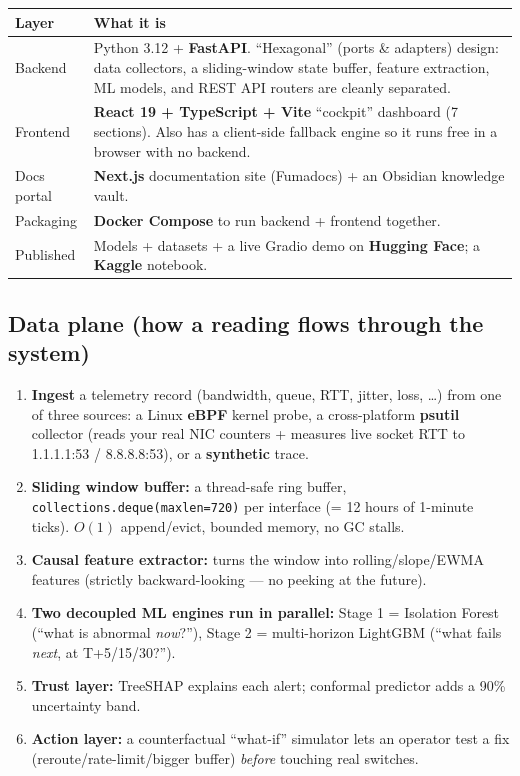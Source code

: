 \documentclass[11pt,a4paper]{article}
\begin{document}
\begin{center}
\begin{tabularx}{\linewidth}{@{}p{3.6cm}X@{}}
\toprule
\textbf{Layer} & \textbf{What it is} \\
\midrule
Backend & Python 3.12 + \textbf{FastAPI}. ``Hexagonal'' (ports \& adapters) design: data collectors, a sliding-window state buffer, feature extraction, ML models, and REST API routers are cleanly separated. \\
Frontend & \textbf{React 19 + TypeScript + Vite} ``cockpit'' dashboard (7 sections). Also has a client-side fallback engine so it runs free in a browser with no backend. \\
Docs portal & \textbf{Next.js} documentation site (Fumadocs) + an Obsidian knowledge vault. \\
Packaging & \textbf{Docker Compose} to run backend + frontend together. \\
Published & Models + datasets + a live Gradio demo on \textbf{Hugging Face}; a \textbf{Kaggle} notebook. \\
\bottomrule
\end{tabularx}
\end{center}

\subsection{Data plane (how a reading flows through the system)}
\begin{enumerate}
  \item \textbf{Ingest} a telemetry record (bandwidth, queue, RTT, jitter, loss, \dots) from one of three
  sources: a Linux \textbf{eBPF} kernel probe, a cross-platform \textbf{psutil} collector (reads your real
  NIC counters + measures live socket RTT to 1.1.1.1:53 / 8.8.8.8:53), or a \textbf{synthetic} trace.
  \item \textbf{Sliding window buffer:} a thread-safe ring buffer, \texttt{collections.deque(maxlen=720)} per
  interface (= 12 hours of 1-minute ticks). $O(1)$ append/evict, bounded memory, no GC stalls.
  \item \textbf{Causal feature extractor:} turns the window into rolling/slope/EWMA features
  (strictly backward-looking --- no peeking at the future).
  \item \textbf{Two decoupled ML engines run in parallel:}
  Stage 1 = Isolation Forest (``what is abnormal \emph{now}?''),
  Stage 2 = multi-horizon LightGBM (``what fails \emph{next}, at T+5/15/30?'').
  \item \textbf{Trust layer:} TreeSHAP explains each alert; conformal predictor adds a 90\% uncertainty band.
  \item \textbf{Action layer:} a counterfactual ``what-if'' simulator lets an operator test a fix (reroute/rate-limit/bigger buffer) \emph{before} touching real switches.
\end{enumerate}
\end{document}
